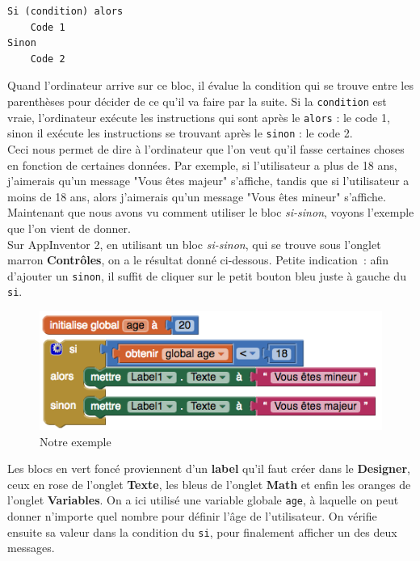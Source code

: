 \documentclass[12t,a4paper]{article}
\begin{document}
\begin{verbatim}
Si (condition) alors
    Code 1
Sinon
    Code 2
\end{verbatim}

Quand l'ordinateur arrive sur ce bloc, il évalue la condition qui se trouve entre les parenthèses pour décider de ce qu'il va faire par la suite. Si la \texttt{condition} est vraie, l'ordinateur exécute les instructions qui sont après le \texttt{alors} : le code 1, sinon il exécute les instructions se trouvant après le \texttt{sinon} : le code 2. \\

Ceci nous permet de dire à l'ordinateur que l'on veut qu'il fasse certaines choses en fonction de certaines données. Par exemple, si l'utilisateur a plus de 18 ans, j'aimerais qu'un message "Vous êtes majeur" s'affiche, tandis que si l'utilisateur a moins de 18 ans, alors j'aimerais qu'un message "Vous êtes mineur" s'affiche. Maintenant que nous avons vu comment utiliser le bloc \textit{si-sinon}, voyons l'exemple que l'on vient de donner. \\

Sur AppInventor 2, en utilisant un bloc \textit{si-sinon}, qui se trouve sous l'onglet marron \textbf{Contrôles}, on a le résultat donné ci-dessous. Petite indication~: afin d'ajouter un \texttt{sinon}, il suffit de cliquer sur le petit bouton bleu juste à gauche du \texttt{si}.

\begin{figure}[h!]
\centering
\includegraphics[scale=0.7]{if_else_exemple}
\caption{Notre exemple}
\label{exemple-if-else}
\end{figure}

Les blocs en vert foncé proviennent d'un \textbf{label} qu'il faut créer dans le \textbf{Designer}, ceux en rose de l'onglet \textbf{Texte}, les bleus de l'onglet \textbf{Math} et enfin les oranges de l'onglet \textbf{Variables}. On a ici utilisé une variable globale \texttt{age}, à laquelle on peut donner n'importe quel nombre pour définir l'âge de l'utilisateur. On vérifie ensuite sa valeur dans la condition du \texttt{si}, pour finalement afficher un des deux messages.\\
\end{document}
